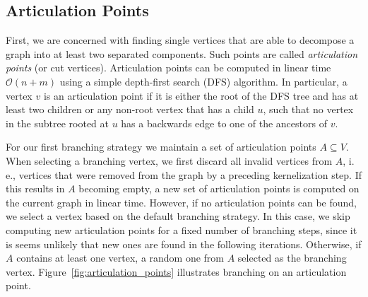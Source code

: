 \documentclass[a4paper,UKenglish,cleveref, autoref, thm-restate]{lipics-v2021}
\newcommand{\ie}{i.\,e.,\xspace}
\begin{document}
\subsection{Articulation Points}
First, we are concerned with finding single vertices that are able to decompose a graph into at least two separated components.
Such points are called \emph{articulation points} (or cut vertices).
Articulation points can be computed in linear time $\mathcal{O}(n+m)$ using a simple depth-first search (DFS) algorithm.
In particular, a vertex $v$ is an articulation point if it is either the root of
the DFS tree and has at least two children or any non-root vertex that has a child $u$, such that no vertex in
the subtree rooted at $u$ has a backwards edge to one of the ancestors of
$v$.

For our first branching strategy we maintain a set of articulation points $A \subseteq V$.
When selecting a branching vertex, we first discard all invalid vertices from $A$, \ie vertices that were removed from the graph by a preceding kernelization step.
If this results in $A$ becoming empty, a new set of articulation points is computed on the current graph in linear time.
However, if no articulation points can be found, we select a vertex based on the default branching strategy.
In this case, we skip computing new articulation points for a fixed number of branching steps, since it is seems unlikely that new ones are found in the following iterations.
Otherwise, if $A$ contains at least one vertex, a random one from $A$ selected as the branching
vertex. Figure~\ref{fig:articulation_points} illustrates branching on an
articulation point.
\end{document}
